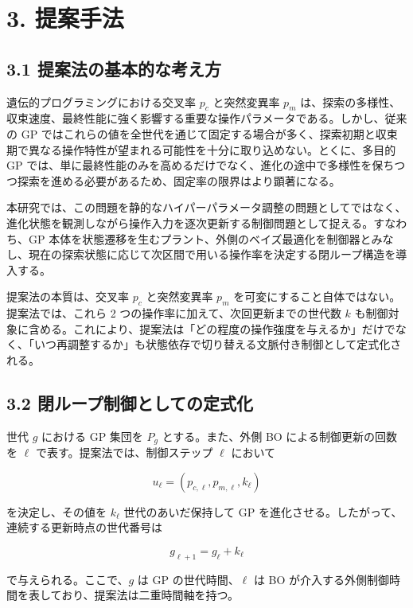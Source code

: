
\section{3. 提案手法}


\subsection{3.1 提案法の基本的な考え方}


遺伝的プログラミングにおける交叉率 $p_c$ と突然変異率 $p_m$ は、探索の多様性、収束速度、最終性能に強く影響する重要な操作パラメータである。しかし、従来の GP ではこれらの値を全世代を通じて固定する場合が多く、探索初期と収束期で異なる操作特性が望まれる可能性を十分に取り込めない。とくに、多目的 GP では、単に最終性能のみを高めるだけでなく、進化の途中で多様性を保ちつつ探索を進める必要があるため、固定率の限界はより顕著になる。

本研究では、この問題を静的なハイパーパラメータ調整の問題としてではなく、進化状態を観測しながら操作入力を逐次更新する制御問題として捉える。すなわち、GP 本体を状態遷移を生むプラント、外側のベイズ最適化を制御器とみなし、現在の探索状態に応じて次区間で用いる操作率を決定する閉ループ構造を導入する。

提案法の本質は、交叉率 $p_c$ と突然変異率 $p_m$ を可変にすること自体ではない。提案法では、これら 2 つの操作率に加えて、次回更新までの世代数 $k$ も制御対象に含める。これにより、提案法は「どの程度の操作強度を与えるか」だけでなく、「いつ再調整するか」も状態依存で切り替える文脈付き制御として定式化される。

\subsection{3.2 閉ループ制御としての定式化}


世代 $g$ における GP 集団を $P_g$ とする。また、外側 BO による制御更新の回数を $\ell$ で表す。提案法では、制御ステップ $\ell$ において

\[
u_\ell = (p_{c,\ell}, p_{m,\ell}, k_\ell)
\]

を決定し、その値を $k_\ell$ 世代のあいだ保持して GP を進化させる。したがって、連続する更新時点の世代番号は

\[
g_{\ell+1} = g_\ell + k_\ell
\]

で与えられる。ここで、$g$ は GP の世代時間、$\ell$ は BO が介入する外側制御時間を表しており、提案法は二重時間軸を持つ。

